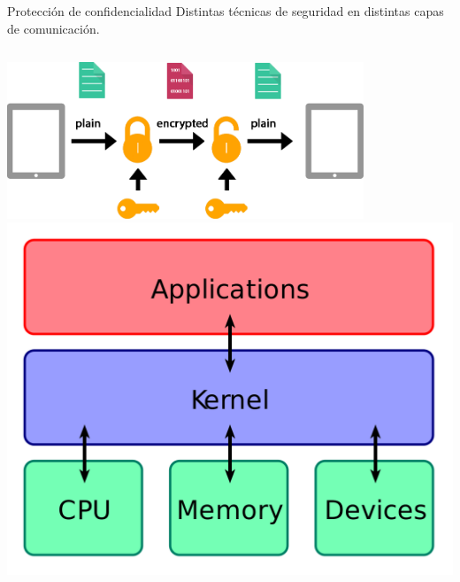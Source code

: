 \documentclass[aspectratio=169,10pt]{beamer}
\begin{document}
\begin{frame}[fragile]{Protección de confidencialidad}
  Distintas técnicas de seguridad en distintas capas de comunicación. \pause
  \vspace{0.5cm}
  \begin{columns}[T,onlytextwidth]
    \includegraphics[width=0.8\textwidth]{images/e2e.png} \pause
    \includegraphics[width=1.0\textwidth]{images/kernel.png}
  \end{columns}
\end{frame}
\end{document}

